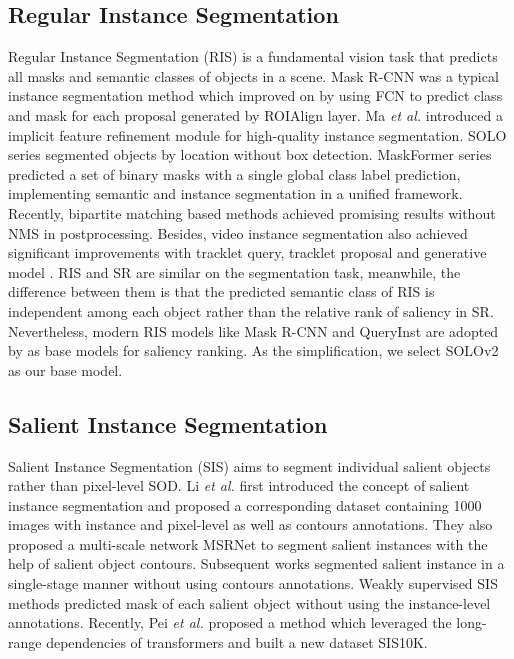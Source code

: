 \documentclass[sigconf]{acmart}
\def\etal{{\em et al.}}
\begin{document}
\subsection{Regular Instance Segmentation}
Regular Instance Segmentation (RIS) is a fundamental vision task that predicts all masks and semantic classes of objects in a scene. Mask R-CNN \cite{he2017mask} was a typical instance segmentation method which improved on \cite{ren2015faster} by using FCN \cite{long2015fully} to predict class and mask for each proposal generated by ROIAlign layer. Ma \etal{} \cite{ma2021implicit} introduced a implicit feature refinement module for high-quality instance segmentation. SOLO series \cite{wang2020solo,wang2020solov2} segmented objects by location without box detection. MaskFormer series \cite{cheng2021per,cheng2022masked} predicted a set of binary masks with a single global class label prediction, implementing semantic and instance segmentation in a unified framework. Recently, bipartite matching \cite{carion2020end} based methods \cite{fang2021instances,cheng2022sparse} achieved promising results without NMS in postprocessing. Besides, video instance segmentation also achieved significant improvements with tracklet query,  tracklet proposal \cite{qin2021learning} and generative model \cite{qin2021learning}. RIS and SR are similar on the segmentation task, meanwhile, the difference between them is that the predicted semantic class of RIS is independent among each object rather than the relative rank of saliency in SR. Nevertheless, modern RIS models like Mask R-CNN \cite{he2017mask} and QueryInst \cite{fang2021instances} are adopted by \cite{siris2020inferring,liu2021instance,tian2022bi} as base models for saliency ranking. As the simplification, we select SOLOv2 \cite{wang2020solov2} as our base model. 

\subsection{Salient Instance Segmentation}
Salient Instance Segmentation (SIS) aims to segment individual salient objects rather than pixel-level SOD. Li \etal{} \cite{li2017instance} first introduced the concept of salient instance segmentation and proposed a corresponding dataset containing 1000 images with instance and pixel-level as well as contours annotations. They also proposed a multi-scale network MSRNet to segment salient instances with the help of salient object contours. Subsequent works \cite{fan2019s4net,wu2021regularized,liu2021scg} segmented salient instance in a single-stage manner without using contours annotations. Weakly supervised SIS methods \cite{tian2020weakly,pei2022salient} predicted mask of each salient object without using the instance-level annotations. Recently, Pei \etal{} proposed a method \cite{pei2022transformer} which leveraged the long-range dependencies of transformers and built a new dataset SIS10K.
\end{document}
